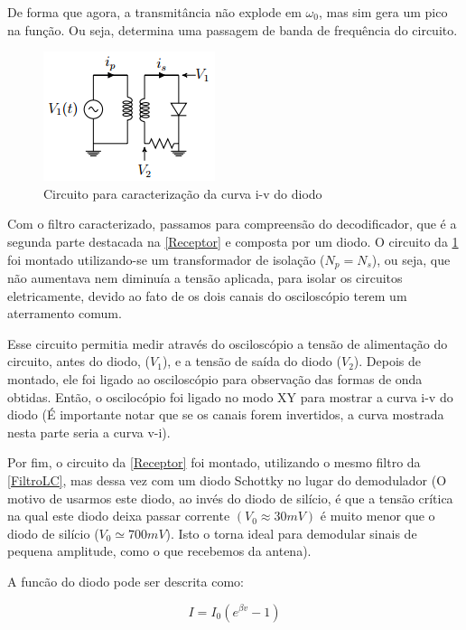 \documentclass[11pt,a4paper]{article}
\begin{document}
    De forma que agora, a transmitância não explode em $\omega _0$, mas sim gera um pico na função. Ou seja, determina uma passagem de banda de frequência do circuito.
    
        \begin{figure}[!htb]
        \centering
        \includegraphics[scale=0.7]{CircDiodo.png}
        \caption{Circuito para caracterização da curva i-v do diodo}
        \label{CircDiodo}
        \end{figure}
        
    Com o filtro caracterizado, passamos para compreensão do decodificador, que é a segunda parte destacada na \cref{Receptor} e composta por um diodo. O circuito da \cref{CircDiodo} foi montado utilizando-se um transformador de isolação ($N_p = N_s$), ou seja, que não aumentava nem diminuía a tensão aplicada, para isolar os circuitos eletricamente, devido ao fato de os dois canais do osciloscópio terem um aterramento comum.
    
    Esse circuito permitia medir através do osciloscópio a tensão de alimentação do circuito, antes do diodo, ($V_1$), e a tensão de saída do diodo ($V_2$). Depois de montado, ele foi ligado ao osciloscópio para observação das formas de onda obtidas.
    Então, o oscilocópio foi ligado no modo XY para mostrar a curva i-v do diodo (É importante notar que se os canais forem invertidos, a curva mostrada nesta parte seria a curva v-i).
    
    Por fim, o circuito da \cref{Receptor} foi montado, utilizando o mesmo filtro da \cref{FiltroLC}, mas dessa vez com um diodo Schottky no lugar do demodulador (O motivo de usarmos este diodo, ao invés do diodo de silício, é que a tensão crítica na qual este diodo deixa passar corrente $(V_0 \approx 30 mV)$ é muito menor que o diodo de silício ($V_0 \simeq 700 mV$). Isto o torna ideal para demodular sinais de pequena amplitude, como o que recebemos da antena).
    
    A funcão do diodo pode ser descrita como:
    
        \begin{equation}
            I=I_0(e^{\beta v}-1)
            \label{eqDiodo}
        \end{equation}
    
\end{document}
